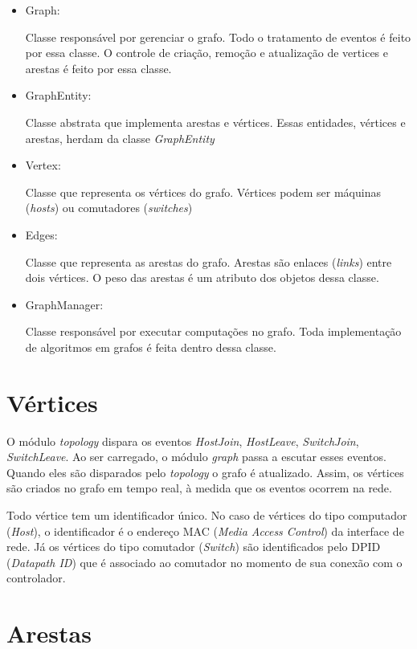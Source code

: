 \begin{itemize}
    \item{Graph}: 
        
        Classe responsável por gerenciar o grafo.
        Todo o tratamento de eventos é feito por essa classe.
        O controle de criação, remoção e atualização de vertices e arestas 
        é feito por essa classe.
    \item{GraphEntity}: 
        
        Classe abstrata que implementa arestas e vértices.
        Essas entidades, vértices e arestas, herdam da classe 
        \emph{GraphEntity}
    \item{Vertex}: 
        
        Classe que representa os vértices do grafo.
        Vértices podem ser máquinas (\emph{hosts}) ou comutadores
        (\emph{switches})
    \item{Edges}: 
        
        Classe que representa as arestas do grafo.
        Arestas são enlaces (\emph{links}) entre dois vértices.
        O peso das arestas é um atributo dos objetos dessa classe.
    \item{GraphManager}: 
        
        Classe responsável por executar computações no grafo.
        Toda implementação de algoritmos em grafos é feita dentro dessa classe.
\end{itemize}

\section{Vértices}

O módulo \emph{topology} dispara os eventos \emph{HostJoin}, \emph{HostLeave},
\emph{SwitchJoin}, \emph{SwitchLeave}.
Ao ser carregado, o módulo \emph{graph} passa a escutar esses eventos.
Quando eles são disparados pelo \emph{topology} o grafo é atualizado.
Assim, os vértices são criados no grafo em tempo real, à medida que os
eventos ocorrem na rede.

Todo vértice tem um identificador único.
No caso de vértices do tipo computador (\emph{Host}), o identificador 
é o endereço MAC (\emph{Media Access Control}) da interface de rede.
Já os vértices do tipo comutador (\emph{Switch}) são identificados pelo 
DPID (\emph{Datapath ID}) que é associado ao comutador no momento de sua 
conexão com o controlador.

\section{Arestas}

